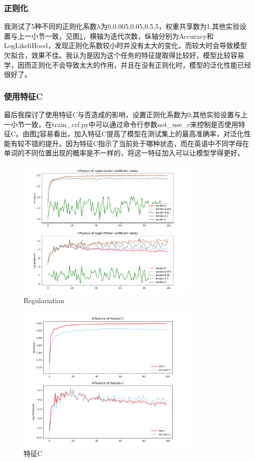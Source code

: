\documentclass[a4paper,UTF8]{article}
\numberwithin{equation}{section}
\begin{document}
\subsubsection{正则化}
我测试了5种不同的正则化系数$\lambda$为0,0.005,0.05,0.5,5，权重共享数为1,其他实验设置与上一小节一致，见图\ref{figure2}，横轴为迭代次数，纵轴分别为Accuracy和LogLikeliHood，发现正则化系数较小时并没有太大的变化，而较大时会导致模型欠拟合，效果不佳。我认为是因为这个任务的特征提取得比较好，模型比较容易学，因而正则化不会导致太大的作用，并且在没有正则化时，模型的泛化性能已经很好了。

\subsubsection{使用特征C}
最后我探讨了使用特征C与否造成的影响，设置正则化系数为0,其他实验设置与上一小节一致，在train\_crf.py中可以通过命令行参数not\_use\_c来控制是否使用特征C。由图\ref{figure3}容易看出，加入特征C提高了模型在测试集上的最高准确率，对泛化性能有较不错的提升。因为特征C指示了当前处于哪种状态，而在英语中不同字母在单词的不同位置出现的概率是不一样的，将这一特征加入可以让模型学得更好。

\begin{figure}[h] 
	\centering
	\includegraphics[width=0.8\textwidth]{figs/Figure_2.png} 
	\caption{Regulariation} 
	\label{figure2}
\end{figure}
\begin{figure}[h] 
	\centering
	\includegraphics[width=0.8\textwidth]{figs/Figure_3.png} 
	\caption{特征C} 
	\label{figure3}
\end{figure}
\end{document}
